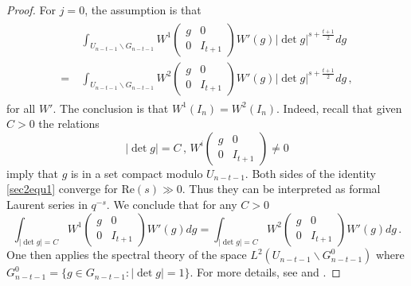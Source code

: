 \documentclass[12pt]{amsart}
\begin{document}
\begin{proof}
For $j=0$, the assumption is that 
\begin{align}\label{sec2equ1}
\begin{split}
\ & \int_{U_{n-t-1} {\backslash} G_{n-t-1}} W^1\begin{pmatrix}
g & 0 \\
0 & I_{t+1}
\end{pmatrix} W'(g) \lvert \det g \rvert^{s+\frac{t+1}{2}} dg\\
= \ & \int_{U_{n-t-1} {\backslash} G_{n-t-1}} W^2\begin{pmatrix}
g & 0 \\
0 & I_{t+1}
\end{pmatrix} W'(g) \lvert \det g \rvert^{s+\frac{t+1}{2}} dg\,,
\end{split}
\end{align}
for all $W'$. The conclusion is that $W^1(I_n)=W^2(I_n)$. 
Indeed, recall that given $C>0$ the relations
\[ \lvert \det g\rvert=C\,,\, W^i  \left(\begin{array}{cc} g & 0 \\ 0 & I_{t+1} \end{array}\right) \neq 0\]
imply that $g$ is in a set compact modulo $U_{n-t-1}$. Both sides of the identity \eqref{sec2equ1} converge for $\mathrm{Re}(s) \gg 0$. Thus they can be interpreted as formal Laurent series in $q^{-s}$. We conclude that for any $C>0$
\[ \int_{\lvert \det g \rvert=C }W^1 \left(\begin{array}{cc} g & 0 \\ 0 & I_{t+1} \end{array}\right) W'(g) dg = \int _{\lvert \det g \rvert=C}W^2 \left(\begin{array}{cc} g & 0 \\ 0 & I_{t+1} \end{array}\right) W'(g)  d g\,. \]
One then applies the spectral theory of the space $L^2 (U_{n-t-1}\backslash G_{n-t-1}^0)$ where $ G_{n-t-1}^0=\{ g \in G_{n-t-1}:\lvert \det g \rvert=1\}$. For more details, see \cite[Section 3]{H93} and \cite[Section 2]{Ch06}.


\end{proof}
\end{document}
